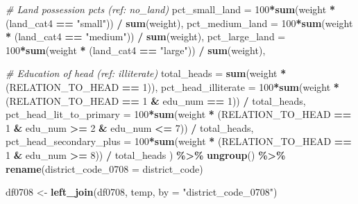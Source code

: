 \documentclass[
]{article}
\newenvironment{Shaded}{\begin{snugshade}}{\end{snugshade}}
\newcommand{\AttributeTok}[1]{\textcolor[rgb]{0.13,0.29,0.53}{#1}}
\newcommand{\CommentTok}[1]{\textcolor[rgb]{0.56,0.35,0.01}{\textit{#1}}}
\newcommand{\DecValTok}[1]{\textcolor[rgb]{0.00,0.00,0.81}{#1}}
\newcommand{\FunctionTok}[1]{\textcolor[rgb]{0.13,0.29,0.53}{\textbf{#1}}}
\newcommand{\NormalTok}[1]{#1}
\newcommand{\OtherTok}[1]{\textcolor[rgb]{0.56,0.35,0.01}{#1}}
\newcommand{\SpecialCharTok}[1]{\textcolor[rgb]{0.81,0.36,0.00}{\textbf{#1}}}
\newcommand{\StringTok}[1]{\textcolor[rgb]{0.31,0.60,0.02}{#1}}
\begin{document}
\begin{Shaded}
\begin{Highlighting}[]
    \CommentTok{\# Land possession pcts (ref: no\_land)}
    \AttributeTok{pct\_small\_land =} \DecValTok{100}\SpecialCharTok{*}\FunctionTok{sum}\NormalTok{(weight }\SpecialCharTok{*}\NormalTok{ (land\_cat4 }\SpecialCharTok{==} \StringTok{"small"}\NormalTok{)) }\SpecialCharTok{/} \FunctionTok{sum}\NormalTok{(weight),}
    \AttributeTok{pct\_medium\_land =} \DecValTok{100}\SpecialCharTok{*}\FunctionTok{sum}\NormalTok{(weight }\SpecialCharTok{*}\NormalTok{ (land\_cat4 }\SpecialCharTok{==} \StringTok{"medium"}\NormalTok{)) }\SpecialCharTok{/} \FunctionTok{sum}\NormalTok{(weight),}
    \AttributeTok{pct\_large\_land =} \DecValTok{100}\SpecialCharTok{*}\FunctionTok{sum}\NormalTok{(weight }\SpecialCharTok{*}\NormalTok{ (land\_cat4 }\SpecialCharTok{==} \StringTok{"large"}\NormalTok{)) }\SpecialCharTok{/} \FunctionTok{sum}\NormalTok{(weight),}
    
    \CommentTok{\# Education of head (ref: illiterate)}
    \AttributeTok{total\_heads =} \FunctionTok{sum}\NormalTok{(weight }\SpecialCharTok{*}\NormalTok{ (RELATION\_TO\_HEAD }\SpecialCharTok{==} \DecValTok{1}\NormalTok{)),}
    \AttributeTok{pct\_head\_illiterate =} \DecValTok{100}\SpecialCharTok{*}\FunctionTok{sum}\NormalTok{(weight }\SpecialCharTok{*}\NormalTok{ (RELATION\_TO\_HEAD }\SpecialCharTok{==} \DecValTok{1} \SpecialCharTok{\&}\NormalTok{ edu\_num }\SpecialCharTok{==} \DecValTok{1}\NormalTok{)) }\SpecialCharTok{/}\NormalTok{ total\_heads,}
    \AttributeTok{pct\_head\_lit\_to\_primary =} \DecValTok{100}\SpecialCharTok{*}\FunctionTok{sum}\NormalTok{(weight }\SpecialCharTok{*}\NormalTok{ (RELATION\_TO\_HEAD }\SpecialCharTok{==} \DecValTok{1} \SpecialCharTok{\&}\NormalTok{ edu\_num }\SpecialCharTok{\textgreater{}=} \DecValTok{2} \SpecialCharTok{\&}\NormalTok{ edu\_num }\SpecialCharTok{\textless{}=} \DecValTok{7}\NormalTok{)) }\SpecialCharTok{/}\NormalTok{ total\_heads,}
    \AttributeTok{pct\_head\_secondary\_plus =} \DecValTok{100}\SpecialCharTok{*}\FunctionTok{sum}\NormalTok{(weight }\SpecialCharTok{*}\NormalTok{ (RELATION\_TO\_HEAD }\SpecialCharTok{==} \DecValTok{1} \SpecialCharTok{\&}\NormalTok{ edu\_num }\SpecialCharTok{\textgreater{}=} \DecValTok{8}\NormalTok{)) }\SpecialCharTok{/}\NormalTok{ total\_heads}
\NormalTok{  ) }\SpecialCharTok{\%\textgreater{}\%}
  \FunctionTok{ungroup}\NormalTok{() }\SpecialCharTok{\%\textgreater{}\%} 
    \FunctionTok{rename}\NormalTok{(}\AttributeTok{district\_code\_0708 =}\NormalTok{ district\_code)}


\NormalTok{df0708 }\OtherTok{\textless{}{-}} \FunctionTok{left\_join}\NormalTok{(df0708, temp, }\AttributeTok{by =} \StringTok{"district\_code\_0708"}\NormalTok{)}





\end{Highlighting}
\end{Shaded}
\end{document}
